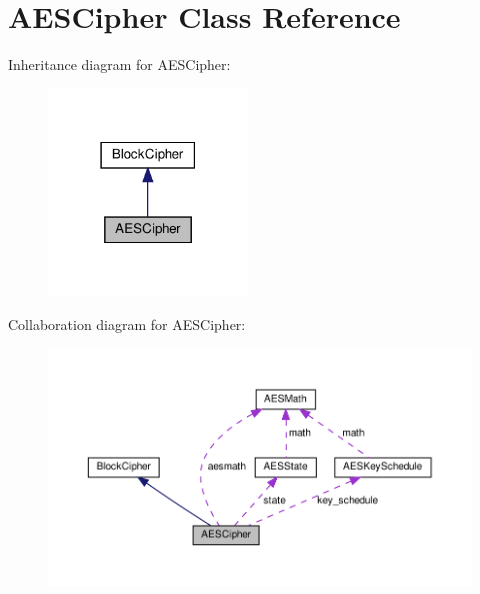 \hypertarget{classAESCipher}{}\section{A\+E\+S\+Cipher Class Reference}
\label{classAESCipher}


Inheritance diagram for A\+E\+S\+Cipher\+:
\nopagebreak
\begin{figure}[H]
\begin{center}
\leavevmode
\includegraphics[width=150pt]{classAESCipher__inherit__graph}
\end{center}
\end{figure}


Collaboration diagram for A\+E\+S\+Cipher\+:
\nopagebreak
\begin{figure}[H]
\begin{center}
\leavevmode
\includegraphics[width=350pt]{classAESCipher__coll__graph}
\end{center}
\end{figure}

